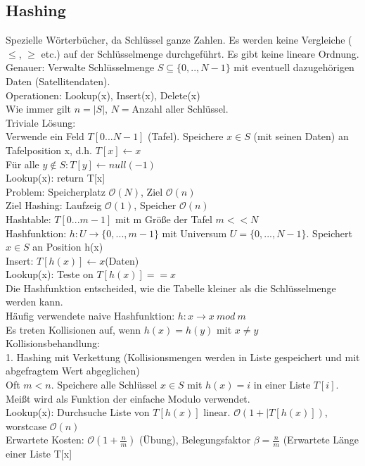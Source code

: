 \documentclass[a4paper]{article}
\newcommand{\oh}[1]{$\mathcal{O}(#1)$}
\begin{document}
\subsection{Hashing}
Spezielle Wörterbücher, da Schlüssel ganze Zahlen. Es werden keine Vergleiche ($\leq$, $\geq$ etc.) auf der Schlüsselmenge durchgeführt. Es gibt keine lineare Ordnung.\\
Genauer: Verwalte Schlüsselmenge $S\subseteq \{0,..,N-1\}$ mit eventuell dazugehörigen Daten (Satellitendaten).\\
Operationen: Lookup(x), Insert(x), Delete(x)\\
Wie immer gilt $n=|S|$, $N=$Anzahl aller Schlüssel.\\
Triviale Lösung: \\
Verwende ein Feld $T[0...N-1]$ (Tafel). Speichere $x\in S$ (mit seinen Daten) an Tafelposition x, d.h. $T[x] \leftarrow x$\\
Für alle $y  \not\in S: T[y] \leftarrow null (-1)$\\
Lookup(x): return T[x]\\
Problem: Speicherplatz \oh{N}, Ziel \oh{n}\\
Ziel Hashing: Laufzeig \oh{1}, Speicher \oh{n}\\
Hashtable: $T[0...m-1]$ mit m Größe der Tafel $m<<N$\\
Hashfunktion: $h: U \rightarrow \{0,...,m-1\}$ mit Universum $U=\{0,...,N-1\}$. Speichert $x\in S$ an Position h(x)\\
Insert: $T[h(x)] \leftarrow x $(Daten)\\
Lookup(x): Teste on $T[h(x)] == x$\\
Die Hashfunktion entscheided, wie die Tabelle kleiner als die Schlüsselmenge werden kann.\\
Häufig verwendete naive Hashfunktion: $h:x\rightarrow x\ mod\ m$\\
Es treten Kollisionen auf, wenn $h(x)=h(y)$ mit $x\neq y$\\
Kollisionsbehandlung:\\
1. Hashing mit Verkettung (Kollisionsmengen werden in Liste gespeichert und mit abgefragtem Wert abgeglichen)\\
Oft $m < n$. Speichere alle Schlüssel $x\in S$ mit $h(x)=i$ in einer Liste $T[i]$. Meißt wird als Funktion der einfache Modulo verwendet.\\
Lookup(x): Durchsuche Liste von $T[h(x)]$ linear. \oh{1+|T[h(x)]}, worstcase \oh{n}\\
\hspace*{1cm} Erwartete Kosten: \oh{1+\frac{n}{m}} (Übung), Belegungsfaktor $\beta = \frac{n}{m}$ (Erwartete Länge einer Liste T[x]\\
\end{document}
